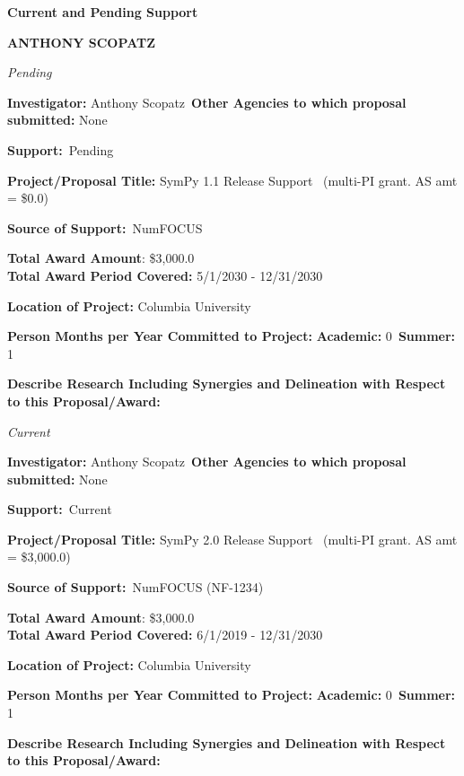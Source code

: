 \documentclass[prl,tighten,amsmath,amssymb,floatfix]{revtex4-1}
\begin{document}
\textbf{Current and Pending Support}

\textbf{ANTHONY SCOPATZ}
\vskip 14pt


\textit{Pending}

\vskip 12pt\noindent
\textbf{Investigator:} Anthony Scopatz\
\textbf{Other Agencies to which proposal submitted:}
None

\textbf{Support:}\ Pending

\textbf{Project/Proposal Title:}  SymPy 1.1 Release Support
\ (multi-PI grant.  AS
amt = \$0.0)

\textbf{Source of Support:}\
NumFOCUS

\textbf{Total Award Amount}:
\$3,000.0\\
\textbf{ Total Award Period Covered:}
5/1/2030 - 12/31/2030

\textbf{Location of Project:} Columbia University

\textbf{Person Months per Year Committed to Project:}
\textbf{Academic:} 0\
\textbf{Summer:} 1

\textbf{Describe Research Including Synergies and Delineation with
Respect to this Proposal/Award:}

\vskip 14pt


\textit{Current}

\vskip 12pt\noindent
\textbf{Investigator:} Anthony Scopatz\
\textbf{Other Agencies to which proposal submitted:}
None

\textbf{Support:}\ Current

\textbf{Project/Proposal Title:}  SymPy 2.0 Release Support
\ (multi-PI grant.  AS
amt = \$3,000.0)


\textbf{Source of Support:}\
NumFOCUS
(NF-1234)

\textbf{Total Award Amount}:
\$3,000.0\\
\textbf{ Total Award Period Covered:}
6/1/2019 - 12/31/2030

\textbf{Location of Project:} Columbia University

\textbf{Person Months per Year Committed to Project:}
\textbf{Academic:} 0\
\textbf{Summer:} 1

\textbf{Describe Research Including Synergies and Delineation with
Respect to this Proposal/Award:}

\vskip 14pt
\end{document}

